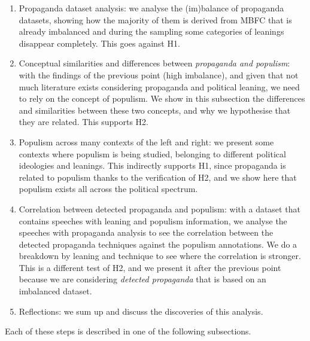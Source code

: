 \begin{enumerate}
    \item Propaganda dataset analysis: we analyse the (im)balance of propaganda datasets, showing how the majority of them is derived from MBFC that is already imbalanced and during the sampling some categories of leanings disappear completely. This goes against H1.
    \item Conceptual similarities and differences between \textit{propaganda and populism}: with the findings of the previous point (high imbalance), and given that not much literature exists considering propaganda and political leaning, we need to rely on the concept of populism. %
    We show in this subsection the differences and similarities between these two concepts, and why we hypothesise that they are related. This supports H2.
    \item Populism across many contexts of the left and right: we present some contexts where populism is being studied, belonging to different political ideologies and leanings. This indirectly supports H1, since propaganda is related to populism thanks to the verification of H2, and we show here that populism exists all across the political spectrum.
    \item Correlation between detected propaganda and populism: with a dataset that contains speeches with leaning and populism information, we analyse the speeches with propaganda analysis to see the correlation between the detected propaganda techniques against the populism annotations. We do a breakdown by leaning and technique to see where the correlation is stronger. This is a different test of H2, and we present it after the previous point because we are considering \textit{detected propaganda} that is based on an imbalanced dataset.
    \item Reflections: we sum up and discuss the discoveries of this analysis.
\end{enumerate}

Each of these steps is described in one of the following subsections. %




